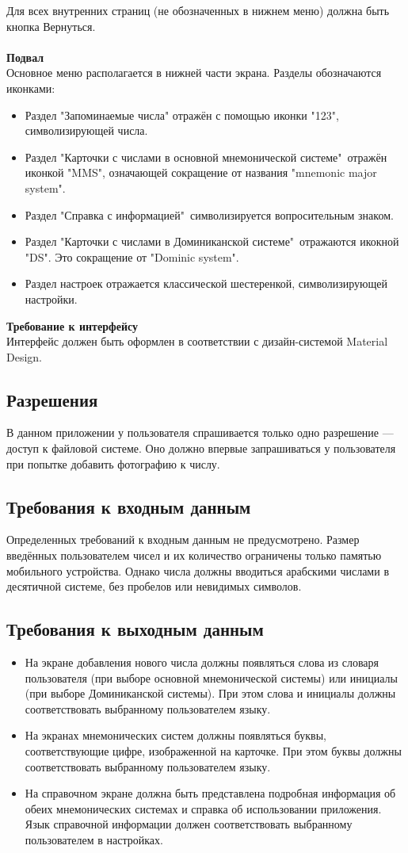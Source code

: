 \documentclass[draft]{article}
\begin{document}
Для всех внутренних страниц (не обозначенных в нижнем меню) должна быть кнопка
Вернуться.\\
~\\
\textbf{Подвал}\\
Основное меню располагается в нижней части экрана. Разделы обозначаются иконками:
\begin{itemize}
\item Раздел "{}Запоминаемые числа"{} отражён с помощью иконки "{}123"{}, символизирующей числа.
\item Раздел "{}Карточки с числами в основной мнемонической системе"{}\ отражён иконкой "{}MMS"{}, означающей сокращение от названия "{}mnemonic major system"{}.
\item Раздел "{}Справка с информацией"{}\ символизируется вопросительным знаком.
\item Раздел "{}Карточки с числами в Доминиканской системе"{}\ отражаются икокной "{}DS"{}. Это сокращение от "{}Dominic system"{}.
\item Раздел настроек отражается классической шестеренкой, символизирующей настройки.
\end{itemize}
\textbf{Требование к интерфейсу}\\
Интерфейс должен быть оформлен в соответствии с дизайн-системой Material Design.
\subsection{Разрешения}
В данном приложении у пользователя спрашивается только одно разрешение — доступ к файловой системе. Оно должно впервые запрашиваться у пользователя при попытке добавить фотографию к числу.
\subsection{Требования к входным данным}
Определенных требований к входным данным не предусмотрено. Размер введённых пользователем чисел и их количество ограничены только памятью мобильного устройства. Однако числа должны вводиться арабскими числами в десятичной системе, без пробелов или невидимых символов.
\subsection{Требования к выходным данным}
\begin{itemize}
\item На экране добавления нового числа должны появляться слова из словаря пользователя (при выборе основной мнемонической системы) или инициалы (при выборе Доминиканской системы). При этом слова и инициалы должны соответствовать выбранному пользователем языку.
\item На экранах мнемонических систем должны появляться буквы, соответствующие цифре, изображенной на карточке. При этом буквы должны соответствовать выбранному пользователем языку.
\item На справочном экране должна быть представлена подробная информация об обеих мнемонических системах и справка об использовании приложения. Язык справочной информации должен соответствовать выбранному пользователем в настройках.
\end{itemize}
\end{document}
